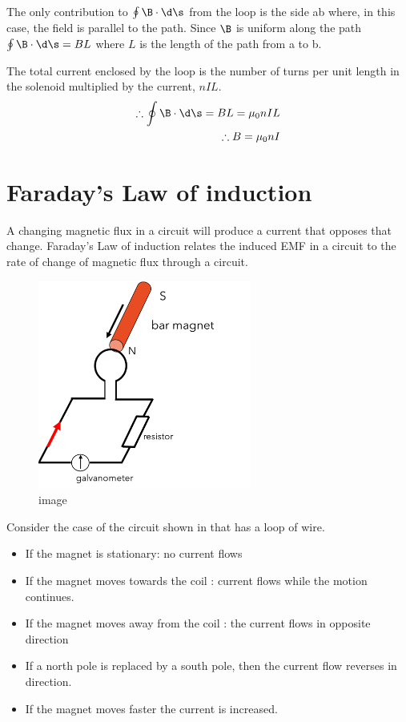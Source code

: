 \documentclass[
]{book}
\begin{document}
The only contribution to \(\oint \B \cdot \d\s\) from the loop is the side
ab where, in this case, the field is parallel to the path. Since \(\B\) is
uniform along the path \(\oint \B \cdot \d\s = BL\) where \(L\) is the
length of the path from a to b.

The total current enclosed by the loop is the number of turns per unit
length in the solenoid multiplied by the current, \(nIL\).
\[\begin{aligned}
\therefore \oint \B \cdot \d\s = BL = \mu_0 nIL \\
\therefore B = \mu_0 nI
\end{aligned}\]

\hypertarget{faradays-law-of-induction}{%
\section{Faraday's Law of induction}\label{faradays-law-of-induction}}

A changing magnetic flux in a circuit will produce a current that
opposes that change. Faraday's Law of induction relates the induced EMF
in a circuit to the rate of change of magnetic flux through a circuit.

\begin{figure}
\centering
\includegraphics[width=70mm,height=\textheight]{Figures/circuit_GR.png}
\caption{image}
\end{figure}

Consider the case of the circuit shown in that has a loop of wire.

\begin{itemize}
\item
  If the magnet is stationary: no current flows
\item
  If the magnet moves towards the coil : current flows while the
  motion continues.
\item
  If the magnet moves away from the coil : the current flows in
  opposite direction
\item
  If a north pole is replaced by a south pole, then the current flow
  reverses in direction.
\item
  If the magnet moves faster the current is increased.
\end{itemize}
\end{document}
